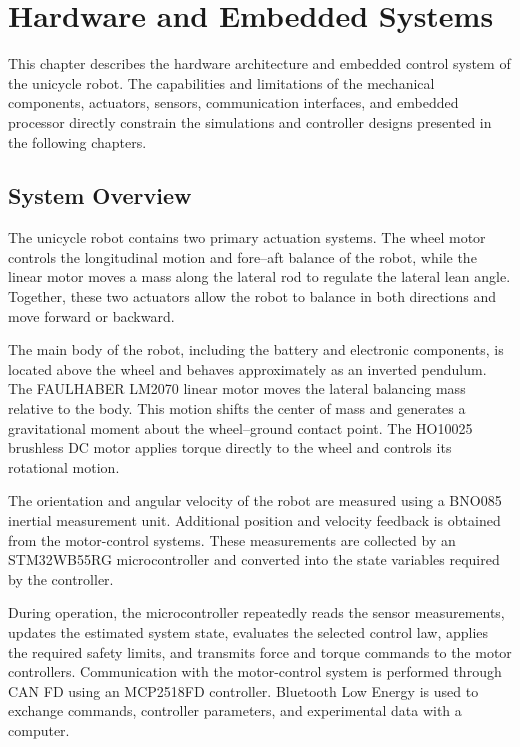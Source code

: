 \chapter{Hardware and Embedded Systems}
\label{chap:hardware}

This chapter describes the hardware architecture and embedded control system of the unicycle robot. The capabilities and limitations of the mechanical components, actuators, sensors, communication interfaces, and embedded processor directly constrain the simulations and controller designs presented in the following chapters.

\section{System Overview}
\label{sec:hardware-overview}

The unicycle robot contains two primary actuation systems. The wheel motor controls the longitudinal motion and fore--aft balance of the robot, while the linear motor moves a mass along the lateral rod to regulate the lateral lean angle. Together, these two actuators allow the robot to balance in both directions and move forward or backward.

The main body of the robot, including the battery and electronic components, is located above the wheel and behaves approximately as an inverted pendulum. The FAULHABER LM2070 linear motor moves the lateral balancing mass relative to the body. This motion shifts the center of mass and generates a gravitational moment about the wheel--ground contact point. The HO10025 brushless DC motor applies torque directly to the wheel and controls its rotational motion.

The orientation and angular velocity of the robot are measured using a BNO085 inertial measurement unit. Additional position and velocity feedback is obtained from the motor-control systems. These measurements are collected by an STM32WB55RG microcontroller and converted into the state variables required by the controller.

During operation, the microcontroller repeatedly reads the sensor measurements, updates the estimated system state, evaluates the selected control law, applies the required safety limits, and transmits force and torque commands to the motor controllers. Communication with the motor-control system is performed through CAN FD using an MCP2518FD controller. Bluetooth Low Energy is used to exchange commands, controller parameters, and experimental data with a computer.

